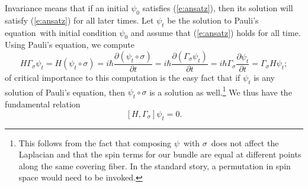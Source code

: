\documentclass[11pt]{article}
\theoremstyle{remark}
\begin{document}
Invariance means that if an initial $\ensuremath{\psi}_0$ satisfies
(\ref{e:ansatz}), then its solution will satisfy (\ref{e:ansatz}) for
all later times. Let $\ensuremath{\psi}_t$  be the solution to Pauli's equation\ with initial
condition $\ensuremath{\psi}_0$ and assume that (\ref{e:ansatz}) holds for all
time. Using Pauli's equation, we  
 compute
\begin{equation*}
  H \ensuremath{\Gamma_{\ensuremath{\sigma}}} \ensuremath{\psi}_t 
= H (\ensuremath{\psi}_t \circ \ensuremath{\sigma}) 
= i \ensuremath{\hbar} \ensuremath{\frac{\partial {(\ensuremath{\psi}_t \circ \ensuremath{\sigma})}}{\partial {t}}}  
= i \ensuremath{\hbar} \ensuremath{\frac{\partial {(\ensuremath{\Gamma_{\ensuremath{\sigma}}} \ensuremath{\psi}_t)}}{\partial {t}}} 
= i \ensuremath{\hbar} \ensuremath{\Gamma_{\ensuremath{\sigma}}} \ensuremath{\frac{\partial {\ensuremath{\psi}_t}}{\partial {t}}} 
= \ensuremath{\Gamma_{\ensuremath{\sigma}}} H \ensuremath{\psi}_t;
\end{equation*}
of critical importance to this computation is the easy fact that if
$\ensuremath{\psi}_t$ is any solution of Pauli's equation, then $\ensuremath{\psi}_t \circ \ensuremath{\sigma}$ is a solution as
well.\footnote{This follows from the fact that composing \ensuremath{\psi}\ with
\ensuremath{\sigma}\ does not affect the Laplacian and that the spin terms for our
bundle are equal at different points along the same covering fiber. In
the standard story, a permutation in spin space would need to be
invoked.} 
We thus have the fundamental relation
\begin{equation} \label{e:commu}
[H, \ensuremath{\Gamma_{\ensuremath{\sigma}}}] \ensuremath{\psi}_t  = 0.  
\end{equation}
\end{document}
